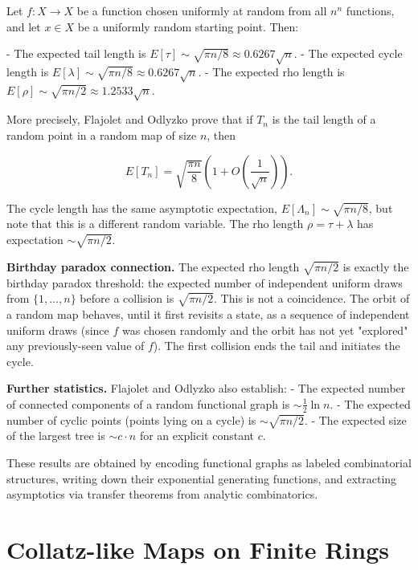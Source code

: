 \begin{theorem}
Let $f: X \to X$ be a function chosen uniformly at random from all $n^n$ functions, and let $x \in X$ be a uniformly random starting point. Then:

- The expected tail length is $E[\tau] \sim \sqrt{\pi n / 8} \approx 0.6267\sqrt{n}$.
- The expected cycle length is $E[\lambda] \sim \sqrt{\pi n / 8} \approx 0.6267\sqrt{n}$.
- The expected rho length is $E[\rho] \sim \sqrt{\pi n / 2} \approx 1.2533\sqrt{n}$.

More precisely, Flajolet and Odlyzko prove that if $T_n$ is the tail length of a random point in a random map of size $n$, then

\[E[T_n] = \sqrt{\frac{\pi n}{8}}\left(1 + O\left(\frac{1}{\sqrt{n}}\right)\right).\]

The cycle length has the same asymptotic expectation, $E[\Lambda_n] \sim \sqrt{\pi n / 8}$, but note that this is a different random variable. The rho length $\rho = \tau + \lambda$ has expectation $\sim \sqrt{\pi n/2}$.

\textbf{Birthday paradox connection.} The expected rho length $\sqrt{\pi n / 2}$ is exactly the birthday paradox threshold: the expected number of independent uniform draws from $\{ 1, \ldots, n\} $ before a collision is $\sqrt{\pi n / 2}$. This is not a coincidence. The orbit of a random map behaves, until it first revisits a state, as a sequence of independent uniform draws (since $f$ was chosen randomly and the orbit has not yet "explored" any previously-seen value of $f$). The first collision ends the tail and initiates the cycle.

\textbf{Further statistics.} Flajolet and Odlyzko also establish:
- The expected number of connected components of a random functional graph is $\sim \frac{1}{2}\ln n$.
- The expected number of cyclic points (points lying on a cycle) is $\sim \sqrt{\pi n / 2}$.
- The expected size of the largest tree is $\sim c \cdot n$ for an explicit constant $c$.

These results are obtained by encoding functional graphs as labeled combinatorial structures, writing down their exponential generating functions, and extracting asymptotics via transfer theorems from analytic combinatorics.
\end{theorem}

\section{Collatz-like Maps on Finite Rings}

